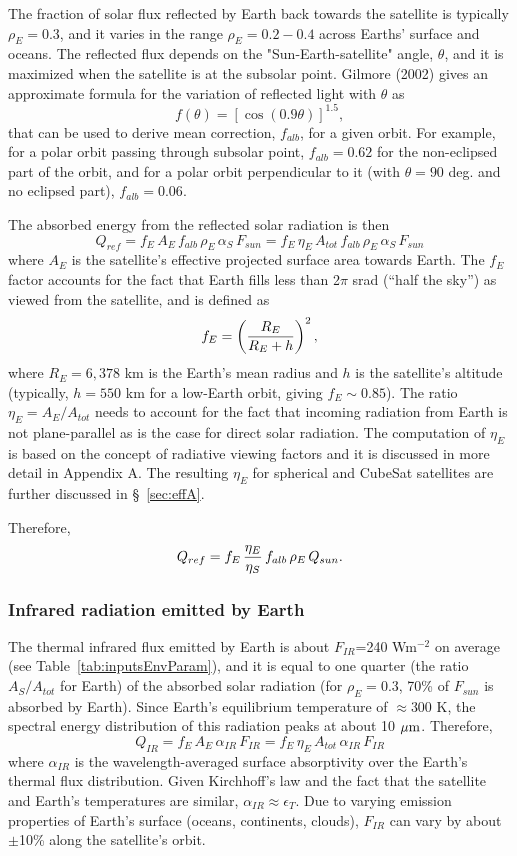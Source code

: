 \documentclass[]{aastex62}
\def\eq#1{\begin{equation} #1 \end{equation}}
\def\mic              {\hbox{$\mu\mathrm{m}$}}
\begin{document}
 
The fraction of solar flux reflected by Earth back towards the satellite is typically $\rho_E=0.3$, and it 
varies in the range $\rho_E=0.2-0.4$ across Earths' surface and oceans. The reflected flux depends on the
"Sun-Earth-satellite" angle, $\theta$, and it is maximized when the satellite is at the subsolar point. 
Gilmore (2002) gives an approximate formula for the variation of reflected light with $\theta$ as 
\eq{
                f(\theta) = \left[ \cos(0.9\theta)\right]^{1.5},
}
that can be used to derive mean correction, $f_{alb}$, for a given orbit. For example, for a polar orbit passing
through subsolar point, $f_{alb}=0.62$ for the non-eclipsed part of the orbit, and for a polar orbit perpendicular 
to it (with $\theta=90$ deg. and no eclipsed part), $f_{alb}=0.06$. 
 
The absorbed energy from the reflected solar radiation is then
\eq{
\label{eq:Qref}
Q_{ref} =  f_E \, A_E  \, f_{alb} \, \rho_E  \, \alpha_S  \,  F_{sun} = f_E \, \eta_E \, A_{tot} \, f_{alb} \, \rho_E  \, \alpha_S  \,  F_{sun} 
}
where $A_E$ is the satellite's effective projected surface area towards Earth. The $f_E$ factor  
accounts for the fact that Earth fills less than 2$\pi$ srad (``half the sky'') as viewed from the satellite, and is defined as 
\eq{
               f_E = \left( R_E \over R_E + h \right)^2,  
}
where $R_E=6,378$ km is the Earth's mean radius and $h$ is the satellite's altitude (typically, $h=550$ km 
for a low-Earth orbit, giving $f_E \sim 0.85$).  The ratio $\eta_E=A_E/A_{tot}$ needs to account for the fact
that incoming radiation from Earth is not plane-parallel as is the case for direct solar radiation. The computation
of $\eta_E$ is based on the concept of radiative viewing factors and it is discussed in more detail in Appendix A. 
The resulting $\eta_E$ for spherical and CubeSat satellites are further discussed in \S~\ref{sec:effA}. 

Therefore, 
\eq{
                          Q_{ref} =  f_E \, {\eta_E \over \eta_S} \, f_{alb} \, \rho_E  \, Q_{sun}. 
}


\subsubsection{Infrared radiation emitted by Earth} 

The thermal infrared flux emitted by Earth is about $F_{IR}$=240 Wm$^{-2}$ on average (see Table~\ref{tab:inputsEnvParam}), 
and it is equal to one quarter (the ratio $A_S/A_{tot}$ for Earth) of the absorbed solar radiation (for $\rho_E=0.3$, 70\% of 
$F_{sun}$ is absorbed by Earth).  Since Earth's equilibrium temperature of $\approx$300 K, the spectral energy 
distribution of this radiation peaks at about 10 $\mic$. Therefore, 
\eq{
              Q_{IR} =  f_E \,  A_E \, \alpha_{IR} \, F_{IR} =  f_E \,  \eta_E \, A_{tot}  \, \alpha_{IR} \, F_{IR} 
}
where $\alpha_{IR}$ is the wavelength-averaged surface absorptivity over the Earth's thermal flux distribution.
Given Kirchhoff's law and the fact that the satellite and Earth's temperatures are similar, 
$\alpha_{IR} \approx \epsilon_T$. Due to varying emission properties of Earth's surface (oceans, continents,
clouds), $F_{IR}$ can vary by about $\pm$10\% along the satellite's orbit. 
\end{document}
